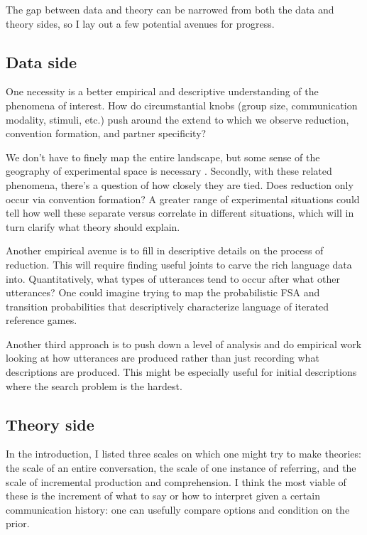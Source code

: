 \documentclass[]{article}
\begin{document}
 The gap between data and theory can be narrowed from both the data and theory sides, so I lay out a few potential avenues for progress. 

\subsection{Data side}
	
	One necessity is a better empirical and descriptive understanding of the phenomena of interest. How do circumstantial knobs (group size, communication modality, stimuli, etc.) push around the extend to which we observe reduction, convention formation, and partner specificity? 
	
	We don't have to finely map the entire landscape, but some sense of the geography of experimental space is necessary \citep{almaatouq2022}. Secondly, with these related phenomena, there's a question of how closely they are tied. Does reduction only occur via convention formation? A greater range of experimental situations could tell how well these separate versus correlate in different situations, which will in turn clarify what theory should explain. 
	
	Another empirical avenue is to fill in descriptive details on the process of reduction. This will require finding useful joints to carve the rich language data into. Quantitatively, what types of utterances tend to occur after what other utterances? One could imagine trying to map the probabilistic FSA and transition probabilities that descriptively characterize language of iterated reference games.
	
	Another third approach is to push down a level of analysis and do empirical work looking at how utterances are produced rather than just recording what descriptions are produced. This might be especially useful for initial descriptions where the search problem is the hardest. 
	
	\subsection{Theory side}
	
	In the introduction, I listed three scales on which one might try to make theories: the scale of an entire conversation, the scale of one instance of referring, and the scale of incremental production and comprehension. 
	I think the most viable of these is the increment of what to say or how to interpret given a certain communication history: one can usefully compare options and condition on the prior. 
	
\end{document}
